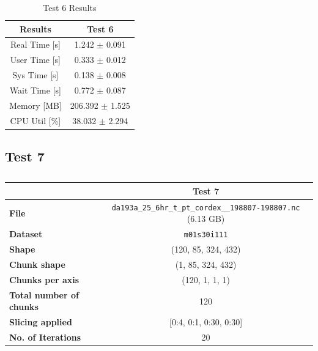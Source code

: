 \documentclass{article}
\begin{document}
\begin{table}[h!]
    \centering
    \begin{tabular}{cc}
        \hline
        \textbf{Results} & Test 6              \\ \hline
        Real Time [s]    & 1.242 $\pm$ 0.091  \\
        User Time [s]    & 0.333 $\pm$ 0.012  \\
        Sys Time [s]     & 0.138 $\pm$ 0.008  \\
        Wait Time [s]    & 0.772 $\pm$ 0.087  \\
        Memory [MB]      & 206.392 $\pm$ 1.525\\
        CPU Util [\%]    & 38.032 $\pm$ 2.294 \\
        \hline
    \end{tabular}
    \caption{Test 6 Results}
    \label{tab:T6_Results}
\end{table}


\break
\subsection{Test 7}

\begin{table}[h!] 
    \centering 
    \begin{tabular}{lc}  \hline
                                        & Test 7                                         \\ \hline
        \textbf{File}                   & \texttt{da193a\_25\_6hr\_t\_pt\_cordex\_\_198807-198807.nc} (6.13 GB)   \\  
        \textbf{Dataset}                &\texttt{ m01s30i111  }                         \\ 
        \textbf{Shape}                  & (120, 85, 324, 432)                             \\ 
        \textbf{Chunk shape}            & (1, 85, 324, 432)                              \\ 
        \textbf{Chunks per axis}        &  (120, 1, 1, 1)                                \\ 
        \textbf{Total number of chunks} & 120                                             \\ 
        \textbf{Slicing applied}        & [0:4, 0:1, 0:30, 0:30]                         \\ 
        \textbf{No. of Iterations}      & 20                                             \\  \hline
    \end{tabular}
    \caption{} 
    \label{tab:T7_Conditions} 
\end{table}
\end{document}

